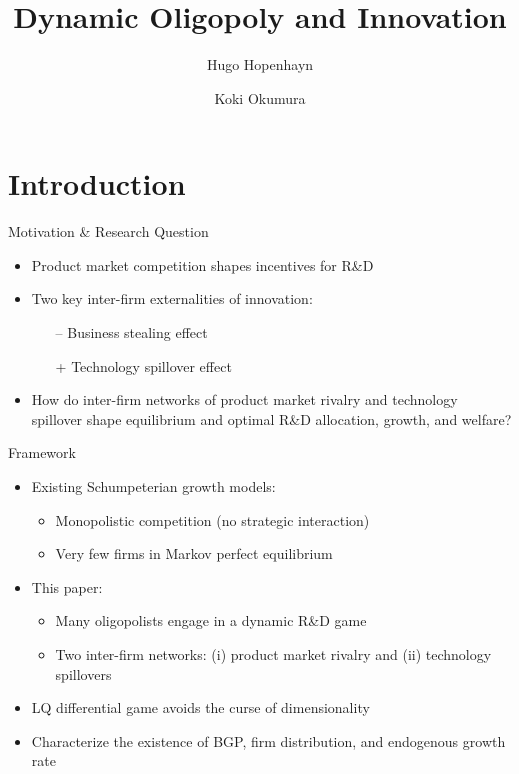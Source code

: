\documentclass[
  10pt,               %
  aspectratio=169,     %
]{beamer}
\title{Dynamic Oligopoly and Innovation}
\author{Hugo Hopenhayn \and Koki Okumura}
\institute{\normalsize UCLA}
\date{}
\theoremstyle{plain}
\begin{document}
\begin{frame}
  \titlepage
\end{frame}

\section{Introduction}

\begin{frame}{Motivation \& Research Question}
  \begin{itemize}
    \item Product market competition shapes incentives for R\&D
          \medskip{}
    \item Two key inter-firm externalities of innovation:
          \begin{itemize}
            \item[--] Business stealing effect
            \item[+] Technology spillover effect
          \end{itemize}
          \medskip{} \pause
    \item How do inter-firm networks of product market rivalry and technology spillover shape equilibrium and optimal R\&D allocation, growth, and welfare?
  \end{itemize}
\end{frame}

\begin{frame}{Framework}
  \begin{itemize}
    \item Existing Schumpeterian growth models:
          \begin{itemize}
            \item Monopolistic competition (no strategic interaction)
            \item Very few firms in Markov perfect equilibrium
          \end{itemize}
          \medskip{} \pause
    \item This paper:
          \begin{itemize}
            \item Many oligopolists engage in a dynamic R\&D game
            \item Two inter-firm networks: (i) product market rivalry and (ii) technology spillovers
          \end{itemize}
          \medskip{} \pause
    \item LQ differential game avoids the curse of dimensionality
          \medskip{}
    \item Characterize the existence of BGP, firm distribution, and endogenous growth rate
  \end{itemize}
\end{frame}
\end{document}
